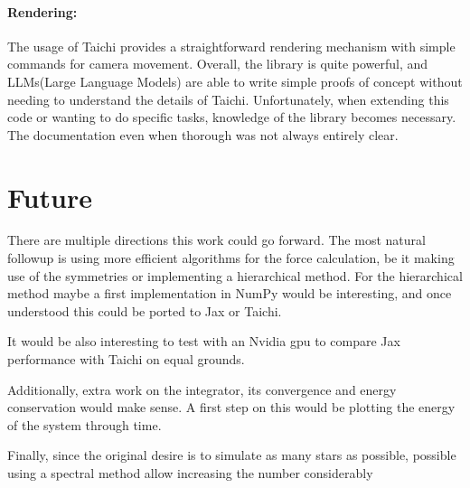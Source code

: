 \documentclass[a4paper, 11pt]{article}         %
\begin{document}
\paragraph{Rendering:}
The usage of Taichi provides a straightforward rendering mechanism with simple commands for camera movement.
Overall, the library is quite powerful, and LLMs(Large Language Models) are able to write simple proofs of concept without needing to understand the details of Taichi. Unfortunately, when extending this code or wanting to do specific tasks, knowledge of the library becomes necessary. The documentation even when thorough was not always entirely clear.


\section{Future}
There are multiple directions this work could go forward.
The most natural followup is using more efficient algorithms for the force calculation, be it making use of the symmetries or implementing a hierarchical method.
For the hierarchical method maybe a first implementation in NumPy would be interesting, and once understood this could be ported to Jax or Taichi.

It would be also interesting to test with an Nvidia gpu to compare Jax performance with Taichi on equal grounds.

Additionally, extra work on the integrator, its convergence and energy conservation would make sense.
A first step on this would be plotting the energy of the system through time.

Finally, since the original desire is to simulate as many stars as possible, possible using a spectral method allow increasing the number considerably

\printbibliography[heading=bibintoc]

\end{document}
